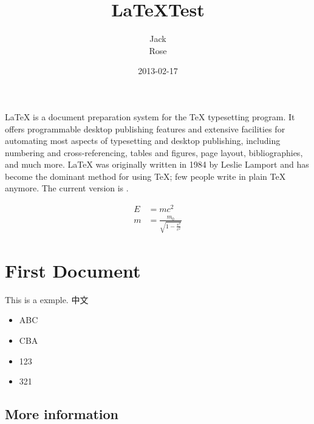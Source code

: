 \documentclass[UTF8, 12pt, a4paper, oneside, titlepage]{book}
\begin{document}
\title{\LaTeX Test}
\author{Jack\\Rose}
\date{\color{blue}2013-02-17}

  \maketitle
  
  \tableofcontents
  
  \LaTeX{} is a document preparation system for the \TeX{}
  typesetting program. It offers programmable desktop publishing
  features and extensive facilities for automating most aspects of
  typesetting and desktop publishing, including numbering and
  cross-referencing, tables and figures, page layout, bibliographies,
  and much more. \LaTeX{} was originally written in 1984 by Leslie
  Lamport and has become the dominant method for using \TeX; few
  people write in plain \TeX{} anymore. The current version is
  \LaTeXe.
 
  \begin{align}
    E &= mc^2                              \\
    m &= \frac{m_0}{\sqrt{1-\frac{v^2}{c^2}}}
  \end{align}

	\section{First Document}
	This is a exmple.
	中文
	\begin{itemize}
	\item ABC
	\item CBA
	\item 123
	\item 321
	\end{itemize}
	
	\subsection{More information}
	
	
	\begin{center}
		
	\end{center}
	
	
	
\end{document}
